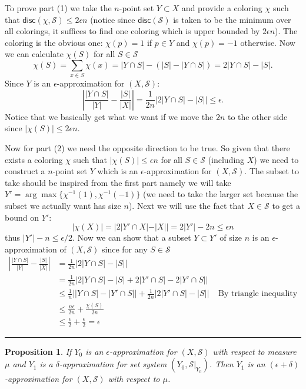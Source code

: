 \documentclass[twoside]{article}
\newtheorem{proposition}[theorem]{Proposition}
\newenvironment{proof}{{\bf Proof:}}{\hfill\rule{2mm}{2mm}}
\newcommand\disc{\mathsf{disc}}
\newcommand\SSet{\mathcal{S}}
\begin{document}
\begin{proof}
To prove part (1) we take the $n$-point set $Y \subset X$ and provide a coloring $\chi$ such that $\disc(\chi, \SSet) \leq 2\epsilon n$ (notice since $\disc (\SSet)$ is taken to be the minimum over all colorings, it suffices to find one coloring which is upper bounded by $2\epsilon n$). The coloring is the obvious one: $\chi(p) = 1$ if $p \in Y$ and $\chi(p) = -1$ otherwise. Now we can calculate $\chi(S)$ for all $S \in \SSet$
\[\chi(S) = \sum_{x \in S} \chi(x) = |Y \cap S| - (|S| - |Y \cap S|) = 2|Y\cap S| - |S|.\]
Since $Y$ is an $\epsilon$-approximation for $(X, \SSet)$:
\[\left| \frac{|Y\cap S|}{|Y|} - \frac{|S|}{|X|} \right| = \frac{1}{2n}\left| 2|Y \cap S| - |S| \right| \leq \epsilon. \]
Notice that we basically get what we want if we move the $2n$ to the other side since $| \chi(S) | \leq 2\epsilon n$.

Now for part (2) we need the opposite direction to be true. So given that there exists a coloring $\chi$ such that $|\chi(S)| \leq \epsilon n$ for all $S \in \SSet$ (including $X$) we need to construct a $n$-point set $Y$ which is an $\epsilon$-approximation for $(X, \SSet)$. The subset to take should be inspired from the first part namely we will take $Y' = \arg\max \{\chi^{-1}(1), \chi^{-1}(-1)\}$ (we need to take the larger set because the subset we actually want has size $n$). Next we will use the fact that $X \in \SSet$ to get a bound on $Y'$:
\[|\chi(X)| = |2|Y' \cap X| - |X|| = 2|Y'| - 2n \leq \epsilon n\]
thus $|Y'| - n \leq \epsilon/2$. 
Now we can show that a subset $Y \subset Y'$ of size $n$ is an $\epsilon$-approximation of $(X, \SSet)$ since for any $S \in \SSet$
\begin{align*}
\left| \frac{|Y \cap S|}{|Y|} - \frac{|S|}{|X|} \right| &= \frac{1}{2n}\left| 2|Y \cap S| - |S| \right| \\
&= \frac{1}{2n}\left| 2|Y \cap S| - |S| + 2|Y' \cap S| - 2|Y' \cap S| \right| \\
&\leq \frac{1}{n}\left| |Y \cap S| - |Y' \cap S| \right| + \frac{1}{2n}\left| 2|Y' \cap S| - |S| \right| &\mbox{ By triangle inequality}\\
&\leq \frac{n\epsilon}{2n} + \frac{\chi(S)}{2n} \\
&\leq \frac{\epsilon}{2} + \frac{\epsilon}{2} = \epsilon
\end{align*}   
\end{proof}

\begin{proposition}
If $Y_0$ is an $\epsilon$-approximation for $(X, \SSet)$ with respect to measure $\mu$ and $Y_1$ is a $\delta$-approximation for set system $(Y_0, \SSet|_{Y_0})$. Then $Y_1$ is an $(\epsilon + \delta)$-approximation for $(X, \SSet)$ with respect to $\mu$. 
\end{proposition}
\end{document}
